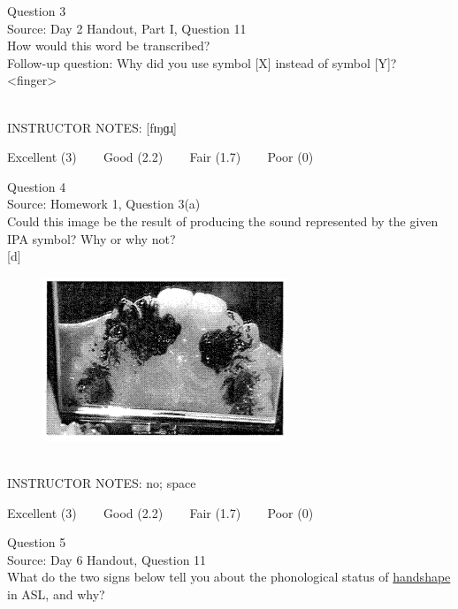 \documentclass[12pt]{article}
\begin{document}
{\large Question 3}\\

Source: Day 2 Handout, Part I, Question 11\\

How would this word be transcribed?\\ Follow-up question: Why did you use symbol [X] instead of symbol [Y]?\\

<finger>


~\\
INSTRUCTOR NOTES: [fɪŋɡɹ̩]


\vfill
Excellent (3) ~~~ Good (2.2) ~~~ Fair (1.7) ~~~ Poor (0)
\newpage

{\large Question 4}\\

Source: Homework 1, Question 3(a)\\

Could this image be the result of producing the sound represented by the given IPA symbol? Why or why not?\\

{[d]}

\begin{figure}[H]
\includegraphics{../images/staticpalatography_fricative.png}
\end{figure}

~\\
INSTRUCTOR NOTES: no; space


\vfill
Excellent (3) ~~~ Good (2.2) ~~~ Fair (1.7) ~~~ Poor (0)
\newpage

{\large Question 5}\\

Source: Day 6 Handout, Question 11\\

What do the two signs below tell you about the phonological status of \underline{handshape} in ASL, and why?\\
\end{document}
